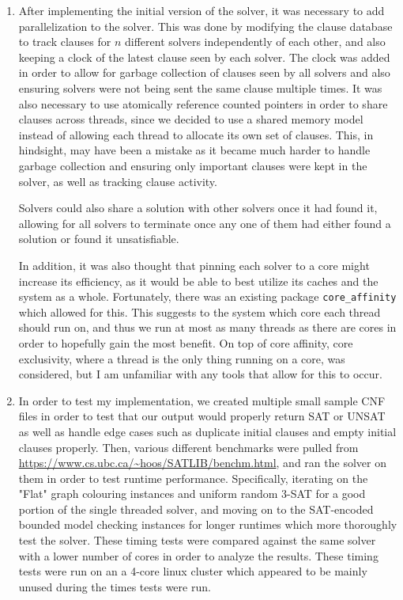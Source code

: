 \documentclass[11pt]{extarticle}
\begin{document}
\begin{enumerate}
\item
After implementing the initial version of the solver, it was necessary to add parallelization to
the solver. This was done by modifying the clause database to track clauses for $n$ different
solvers independently of each other, and also keeping a clock of the latest clause seen by each
solver. The clock was added in order to allow for garbage collection of clauses seen by all
solvers and also ensuring solvers were not being sent the same clause multiple times. It was
also necessary to use atomically reference counted pointers in order to share clauses across
threads, since we decided to use a shared memory model instead of allowing each thread to
allocate its own set of clauses. This, in hindsight, may have been a mistake as it became much
harder to handle garbage collection and ensuring only important clauses were kept in the solver,
as well as tracking clause activity.

Solvers could also share a solution with other solvers once it had found it, allowing for all
solvers to terminate once any one of them had either found a solution or found it unsatisfiable.

In addition, it was also thought that pinning each solver to a core might increase its
efficiency, as it would be able to best utilize its caches and the system as a whole.
Fortunately, there was an existing package \texttt{core\_affinity} which allowed for this. This
suggests to the system which core each thread should run on, and thus we run at most as many
threads as there are cores in order to hopefully gain the most benefit. On top of core affinity,
core exclusivity, where a thread is the only thing running on a core, was considered, but I am
unfamiliar with any tools that allow for this to occur.

\item
In order to test my implementation, we created multiple small sample CNF files in order to test
that our output would properly return SAT or UNSAT as well as handle edge cases such as
duplicate initial clauses and empty initial clauses properly. Then, various different
benchmarks were pulled from \url{https://www.cs.ubc.ca/~hoos/SATLIB/benchm.html}, and ran the
solver on them in order to test runtime performance. Specifically, iterating on the "Flat"
graph colouring instances and uniform random 3-SAT for a good portion of the single threaded
solver, and moving on to the SAT-encoded bounded model checking instances for longer runtimes
which more thoroughly test the solver. These timing tests were compared against the same solver
with a lower number of cores in order to analyze the results. These timing tests were run on an
a 4-core linux cluster which appeared to be mainly unused during the times tests were run.
\end{enumerate}
\end{document}
